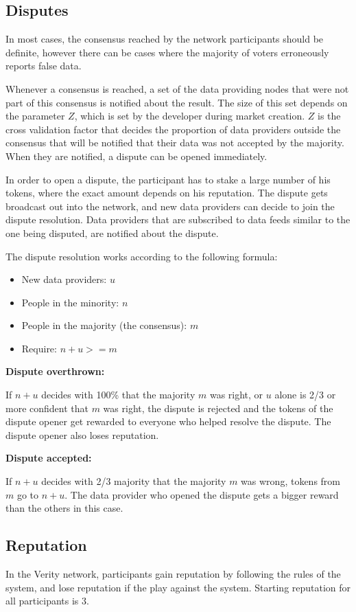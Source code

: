 \subsection*{Disputes}
In most cases, the consensus reached by the network participants should be definite, however there can be cases where the majority of voters erroneously reports false data.

Whenever a consensus is reached, a set of the data providing nodes that were not part of this consensus is notified about the result. The size of this set depends on the parameter $Z$, which is set by the developer during market creation. $Z$ is the cross validation factor that decides the proportion of data providers outside the consensus that will be notified that their data was not accepted by the majority. When they are notified, a dispute can be opened immediately.

In order to open a dispute, the participant has to stake a large number of his tokens, where the exact amount depends on his reputation. The dispute gets broadcast out into the network, and new data providers can decide to join the dispute resolution. Data providers that are subscribed to data feeds similar to the one being disputed, are notified about the dispute.

The dispute resolution works according to the following formula:
\begin{itemize}
\item New data providers: $u$
\item People in the minority: $n$
\item People in the majority (the consensus): $m$
\item Require: $n + u >= m$
\end{itemize}
\textbf{Dispute overthrown:}

If $n + u$ decides with 100\% that the majority $m$ was right, or $u$ alone is 2/3 or more confident that $m$ was right, the dispute is rejected and the tokens of the dispute opener get rewarded to everyone who helped resolve the dispute. The dispute opener also loses reputation.

\newpage

\textbf{Dispute accepted:}

If $n + u$ decides with 2/3 majority that the majority $m$ was wrong, tokens from $m$ go to $n + u$. The data provider who opened the dispute gets a bigger reward than the others in this case.

\subsection*{Reputation}
In the Verity network, participants gain reputation by following the rules of the system, and lose reputation if the play against the system. Starting reputation for all participants is $3$.

